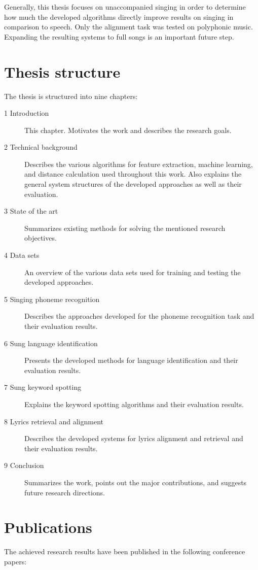 Generally, this thesis focuses on unaccompanied singing in order to determine how much the developed algorithms directly improve results on singing in comparison to speech. Only the alignment task was tested on polyphonic music. Expanding the resulting systems to full songs is an important future step.

\section{Thesis structure}
The thesis is structured into nine chapters:
\begin{description}
\item[1 Introduction] This chapter. Motivates the work and describes the research goals.
\item[2 Technical background] Describes the various algorithms for feature extraction, machine learning, and distance calculation used throughout this work. Also explains the general system structures of the developed approaches as well as their evaluation.
\item[3 State of the art] Summarizes existing methods for solving the mentioned research objectives.
\item[4 Data sets] An overview of the various data sets used for training and testing the developed approaches.
\item[5 Singing phoneme recognition] Describes the approaches developed for the phoneme recognition task and their evaluation results.
\item[6 Sung language identification] Presents the developed methods for language identification and their evaluation results.
\item[7 Sung keyword spotting] Explains the keyword spotting algorithms and their evaluation results.
\item[8 Lyrics retrieval and alignment] Describes the developed systems for lyrics alignment and retrieval and their evaluation results.
\item[9 Conclusion] Summarizes the work, points out the major contributions, and suggests future research directions.
\end{description}


\section{Publications}
The achieved research results have been published in the following conference papers:

